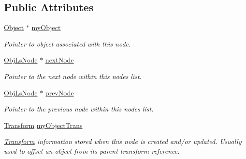 \subsection*{Public Attributes}
\begin{DoxyCompactItemize}
\item 
\hypertarget{struct_obj_ls_node_a2b1d525574c323263c4b6fce4e0a45c4}{}\label{struct_obj_ls_node_a2b1d525574c323263c4b6fce4e0a45c4} 
\hyperlink{class_object}{Object} $\ast$ \hyperlink{struct_obj_ls_node_a2b1d525574c323263c4b6fce4e0a45c4}{my\+Object}
\begin{DoxyCompactList}\small\item\em Pointer to object associated with this node. \end{DoxyCompactList}\item 
\hypertarget{struct_obj_ls_node_aae78b2902eeed5cf1104057251d2bcdc}{}\label{struct_obj_ls_node_aae78b2902eeed5cf1104057251d2bcdc} 
\hyperlink{struct_obj_ls_node}{Obj\+Ls\+Node} $\ast$ \hyperlink{struct_obj_ls_node_aae78b2902eeed5cf1104057251d2bcdc}{next\+Node}
\begin{DoxyCompactList}\small\item\em Pointer to the next node within this node\textquotesingle{}s list. \end{DoxyCompactList}\item 
\hypertarget{struct_obj_ls_node_a99f388a245b879697357c363fd972668}{}\label{struct_obj_ls_node_a99f388a245b879697357c363fd972668} 
\hyperlink{struct_obj_ls_node}{Obj\+Ls\+Node} $\ast$ \hyperlink{struct_obj_ls_node_a99f388a245b879697357c363fd972668}{prev\+Node}
\begin{DoxyCompactList}\small\item\em Pointer to the previous node within this node\textquotesingle{}s list. \end{DoxyCompactList}\item 
\hypertarget{struct_obj_ls_node_aa002f5d20dccf6c1fa442d66538e46b1}{}\label{struct_obj_ls_node_aa002f5d20dccf6c1fa442d66538e46b1} 
\hyperlink{class_transform}{Transform} \hyperlink{struct_obj_ls_node_aa002f5d20dccf6c1fa442d66538e46b1}{my\+Object\+Trans}
\begin{DoxyCompactList}\small\item\em \hyperlink{class_transform}{Transform} information stored when this node is created and/or updated. Usually used to offset an object from its parent transform reference. \end{DoxyCompactList}\end{DoxyCompactItemize}


